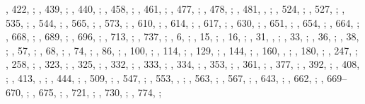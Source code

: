 \begin{autindex}
    , 422, ;
    , 439, ;
    , 440, ;
    , 458, ;
    , 461, ;
    , 477, ;
    , 478, ;
    , 481, , ;
    , 524, ;
    , 527, ;
    , 535, ;
    , 544, ;
    , 565, ;
    , 573, ;
    , 610, ;
    , 614, ;
    , 617, ;
    , 630, ;
    , 651, ;
    , 654, ;
    , 664, ;
    , 668, ;
    , 689, ;
    , 696, ;
    , 713, ;
    , 737, ;
    ,   6, ;
    ,  15, ;
    ,  16, ;
    ,  31, , ;
    ,  33, ;
    ,  36, ;
    ,  38, ;
    ,  57, ;
    ,  68, ;
    ,  74, ;
    ,  86, ;
    , 100, ;
    , 114, ;
    , 129, ;
    , 144, ;
    , 160, , ;
    , 180, ;
    , 247, ;
    , 258, ;
    , 323, ;
    , 325, ;
    , 332, ;
    , 333, ;
    , 334, ;
    , 353, ;
    , 361, ;
    , 377, ;
    , 392, ;
    , 408, ;
    , 413, , ;
    , 444, ;
    , 509, ;
    , 547, ;
    , 553, , ;
    , 563, ;
    , 567, ;
    , 643, ;
    , 662, ;
    , 669–670, ;
    , 675, ;
    , 721, ;
    , 730, ;
    , 774, ;

\end{autindex}
